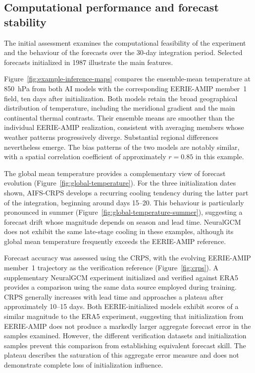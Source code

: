 \subsection{Computational performance and forecast stability}
\label{sec:performance-stability}

The initial assessment examines the computational feasibility of the experiment and the behaviour of the forecasts over the 30-day integration period. Selected forecasts initialized in 1987 illustrate the main features.

Figure~\ref{fig:example-inference-maps} compares the ensemble-mean temperature at 850~hPa from both AI models with the corresponding EERIE-AMIP member~1 field, ten days after initialization. Both models retain the broad geographical distribution of temperature, including the meridional gradient and the main continental thermal contrasts. Their ensemble means are smoother than the individual EERIE-AMIP realization, consistent with averaging members whose weather patterns progressively diverge. Substantial regional differences nevertheless emerge. The bias patterns of the two models are notably similar, with a spatial correlation coefficient of approximately $r=0.85$ in this example.

The global mean temperature provides a complementary view of forecast evolution (Figure~\ref{fig:global-temperature}). For the three initialization dates shown, AIFS-CRPS develops a recurring cooling tendency during the latter part of the integration, beginning around days 15--20. This behaviour is particularly pronounced in summer (Figure~\ref{fig:global-temperature-summer}), suggesting a forecast drift whose magnitude depends on season and lead time. NeuralGCM does not exhibit the same late-stage cooling in these examples, although its global mean temperature frequently exceeds the EERIE-AMIP reference.

Forecast accuracy was assessed using the CRPS, with the evolving EERIE-AMIP member~1 trajectory as the verification reference (Figure~\ref{fig:crps}). A supplementary NeuralGCM experiment initialized and verified against ERA5 provides a comparison using the same data source employed during training. CRPS generally increases with lead time and approaches a plateau after approximately 10--15 days. Both EERIE-initialized models exhibit scores of a similar magnitude to the ERA5 experiment, suggesting that initialization from EERIE-AMIP does not produce a markedly larger aggregate forecast error in the samples examined. However, the different verification datasets and initialization samples prevent this comparison from establishing equivalent forecast skill. The plateau describes the saturation of this aggregate error measure and does not demonstrate complete loss of initialization influence.

